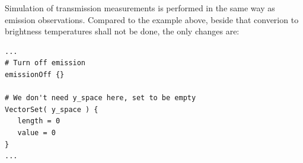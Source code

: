 
 Simulation of transmission measurements is performed in the same way
 as emission observations. Compared to the example above, beside that
 converion to brightness temperatures shall not be done, the only
 changes are:
 {\footnotesize
 \begin{verbatim}
...
# Turn off emission
emissionOff {}

# We don't need y_space here, set to be empty
VectorSet( y_space ) {
   length = 0
   value = 0
}
...
 \end{verbatim}
 }
\noindent


